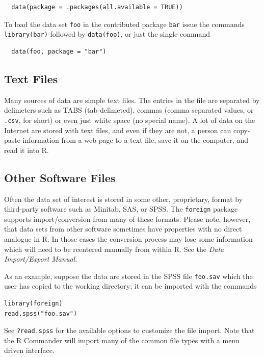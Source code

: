 \documentclass[captions=tableheading]{scrbook}
\begin{document}
\begin{verbatim}
  data(package = .packages(all.available = TRUE))
\end{verbatim}

To load the data set \texttt{foo} in the contributed package \texttt{bar} issue the commands \texttt{library(bar)} followed by \texttt{data(foo)}, or just the single command  

\begin{verbatim}
  data(foo, package = "bar")
\end{verbatim}
\subsection{Text Files}
\label{sec-20-2-2}

Many sources of data are simple text files. The entries in the file are separated by delimeters such as TABS (tab-delimeted), commas (comma separated values, or \texttt{.csv}, for short) or even just white space (no special name). A lot of data on the Internet are stored with text files, and even if they are not, a person can copy-paste information from a web page to a text file, save it on the computer, and read it into \textsf{R}. 
\subsection{Other Software Files}
\label{sec-20-2-3}

Often the data set of interest is stored in some other, proprietary, format by third-party software such as Minitab, SAS, or SPSS. The \texttt{foreign} package supports import/conversion from many of these formats. Please note, however, that data sets from other software sometimes have properties with no direct analogue in \textsf{R}. In those cases the conversion process may lose some information which will need to be reentered manually from within \textsf{R}. See the \emph{Data Import/Export Manual}.

As an example, suppose the data are stored in the SPSS file \texttt{foo.sav} which the user has copied to the working directory; it can be imported with the commands


\begin{verbatim}
library(foreign)
read.spss("foo.sav")
\end{verbatim}

See \texttt{?read.spss} for the available options to customize the file import. Note that the \textsf{R} Commander will import many of the common file types with a menu driven interface.
\end{document}
